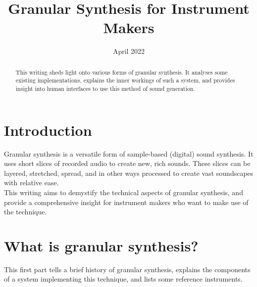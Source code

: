 \documentclass[10pt, twocolumn]{IEEEtran}
\title{Granular Synthesis for Instrument Makers}
\author{	
	\IEEEauthorblockN{Daniël Kamp\\}
    \IEEEauthorblockA{HKU University of the Arts Utrecht
    \\daniel.kamp@student.hku.nl}
    }
\date{April 2022}
\begin{document}
\maketitle

\begin{abstract}
This writing sheds light onto various forms of granular synthesis. It analyses some existing implementations, explains the inner workings of such a system, and provides insight into human interfaces to use this method of sound generation.
\end{abstract}

\section*{Introduction}
Granular synthesis is a versatile form of sample-based (digital) sound synthesis. It uses short slices of recorded audio to create new, rich sounds. These slices can be layered, stretched, spread, and in other ways processed to create vast soundscapes with relative ease. \\
This writing aims to demystify the technical aspects of granular synthesis, and provide a comprehensive insight for instrument makers who want to make use of the technique.

\section{What is granular synthesis?}
This first part tells a brief history of granular synthesis, explains the components of a system implementing this technique, and lists some reference instruments.
\end{document}
